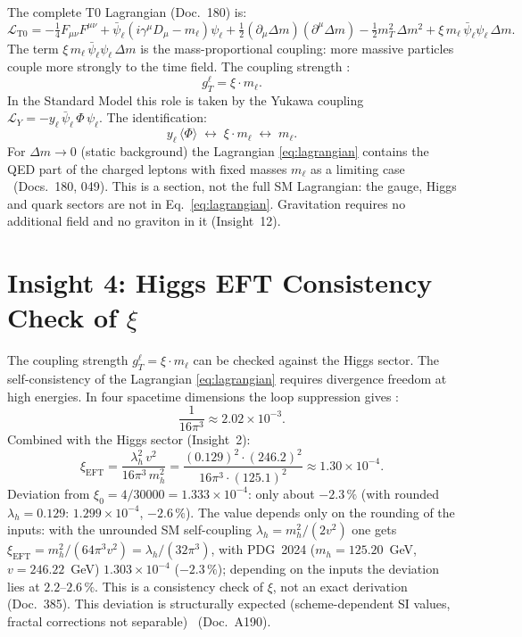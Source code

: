 The complete T0 Lagrangian (Doc.~180) is:
\begin{equation}
  \mathcal{L}_{\text{T0}} =
  -\tfrac{1}{4}F_{\mu\nu}F^{\mu\nu}
  + \bar\psi_\ell(i\gamma^\mu D_\mu - m_\ell)\psi_\ell
  + \tfrac{1}{2}(\partial_\mu\Delta m)(\partial^\mu\Delta m)
  - \tfrac{1}{2}m_T^2\,\Delta m^2
  + \xi\,m_\ell\,\bar\psi_\ell\psi_\ell\,\Delta m.
  \label{eq:lagrangian}
\end{equation}
The term $\xi\,m_\ell\,\bar\psi_\ell\psi_\ell\,\Delta m$ is the
mass-proportional coupling: more massive particles couple more strongly
to the time field. The coupling strength \BM:
\begin{equation}
  g_T^\ell = \xi\cdot m_\ell.
  \label{eq:coupling}
\end{equation}
In the Standard Model this role is taken by the Yukawa coupling
$\mathcal{L}_Y = -y_\ell\,\bar\psi_\ell\,\Phi\,\psi_\ell$. The identification:
\begin{equation}
  y_\ell\,\langle\Phi\rangle \;\leftrightarrow\; \xi\cdot m_\ell
  \;\leftrightarrow\; m_\ell.
  \label{eq:yukawa_id}
\end{equation}
For $\Delta m \to 0$ (static background) the Lagrangian \eqref{eq:lagrangian}
contains the QED part of the charged leptons with fixed masses $m_\ell$ as a
limiting case \BM\ (Docs.~180, 049). This is a section, not the full SM
Lagrangian: the gauge, Higgs and quark sectors are not in
Eq.~\eqref{eq:lagrangian}. Gravitation requires no additional field and no
graviton in it (Insight~12).

\section{Insight 4: Higgs EFT Consistency Check of $\xi$}

The coupling strength $g_T^\ell = \xi\cdot m_\ell$ can be checked against the Higgs sector.
The self-consistency of the Lagrangian \eqref{eq:lagrangian} requires
divergence freedom at high energies. In four spacetime dimensions the
loop suppression gives \BM:
\begin{equation}
  \frac{1}{16\pi^3} \approx 2.02\times10^{-3}.
\end{equation}
Combined with the Higgs sector (Insight~2):
\begin{equation}
  \xi_{\text{EFT}} = \frac{\lambda_h^2\,v^2}{16\pi^3\,m_h^2}
  = \frac{(0.129)^2\cdot(246.2)^2}{16\pi^3\cdot(125.1)^2}
  \approx 1.30\times10^{-4}.
  \label{eq:xi_eft}
\end{equation}
Deviation from $\xi_0 = 4/30000 = 1.333\times10^{-4}$: only about $-2.3\,\%$ (with rounded $\lambda_h = 0.129$: $1.299\times10^{-4}$, $-2.6\,\%$).
The value depends only on the rounding of the inputs: with the unrounded SM
self-coupling $\lambda_h = m_h^2/(2v^2)$ one gets
$\xi_{\text{EFT}} = m_h^2/(64\pi^3 v^2) = \lambda_h/(32\pi^3)$, with PDG~2024
($m_h = 125.20$~GeV, $v = 246.22$~GeV) $1.303\times10^{-4}$ ($-2.3\,\%$);
depending on the inputs the deviation lies at $2.2$--$2.6\,\%$. This is a
consistency check of $\xi$, not an exact derivation (Doc.~385).
This deviation is structurally expected (scheme-dependent SI values,
fractal corrections not separable) \KM\ (Doc.~A190).

